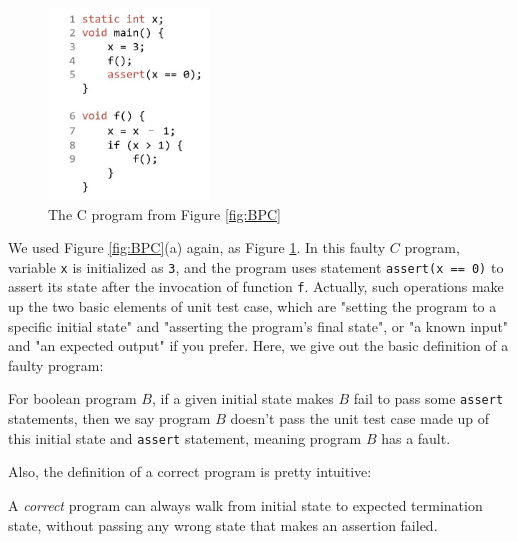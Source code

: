 \begin{figure}
\centering
\includegraphics[width=1.7in,height=2in]{img/Fig3-1.jpg}
\caption{The C program from Figure \ref{fig:BPC}}
\label{fig:FC}
\end{figure}

We used Figure \ref{fig:BPC}(a) again, as Figure \ref{fig:FC}. In this faulty $C$ program, variable \lstinline|x| is initialized as \lstinline|3|, and the program uses statement \lstinline|assert(x == 0)| to assert its state after the invocation of function \lstinline|f|.
Actually, such operations make up the two basic elements of unit test case, which are "setting the program to a specific initial state" and "asserting the program's final state", or "a known input" and "an expected output" if you prefer.
Here, we give out the basic definition of a faulty program:

\begin{definition}
\label{definition:FaultyProgram}
For boolean program $B$, if a given initial state makes $B$ fail to pass some \lstinline|assert| statements, then we say program $B$ doesn't pass the unit test case made up of this initial state and \lstinline|assert| statement,
meaning program $B$ has a fault.
\end{definition}

Also, the definition of a correct program is pretty intuitive:

\begin{definition}
\label{definition:CorrectProgram}
A {\it correct} program can always walk from initial state to expected termination state, without passing any wrong state that makes an assertion failed.
\end{definition}

